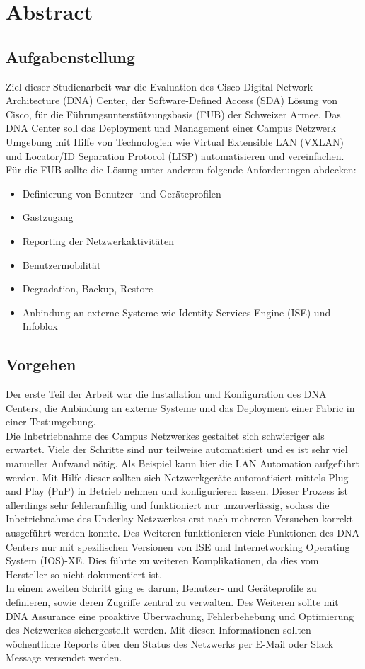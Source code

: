 \section{Abstract}

\subsection{Aufgabenstellung}

Ziel dieser Studienarbeit war die Evaluation des Cisco Digital Network Architecture (DNA) Center, der Software-Defined Access (SDA) Lösung von Cisco, für die Führungsunterstützungsbasis (FUB) der Schweizer Armee. Das DNA Center soll das Deployment und Management einer Campus Netzwerk Umgebung mit Hilfe von Technologien wie Virtual Extensible LAN (VXLAN) und Locator/ID Separation Protocol (LISP) automatisieren und vereinfachen.\\
Für die FUB sollte die Lösung unter anderem folgende Anforderungen abdecken:
\begin{itemize}
	\item Definierung von Benutzer- und Geräteprofilen
	\item Gastzugang
	\item Reporting der Netzwerkaktivitäten
	\item Benutzermobilität
	\item Degradation, Backup, Restore
	\item Anbindung an externe Systeme wie Identity Services Engine (ISE) und Infoblox
\end{itemize}

\subsection{Vorgehen}
Der erste Teil der Arbeit war die Installation und Konfiguration des DNA Centers, die Anbindung an externe Systeme und das Deployment einer Fabric in einer Testumgebung.\\
Die Inbetriebnahme des Campus Netzwerkes gestaltet sich schwieriger als erwartet. Viele der Schritte sind nur teilweise automatisiert und es ist sehr viel manueller Aufwand nötig. Als Beispiel kann hier die LAN Automation aufgeführt werden. Mit Hilfe dieser sollten sich Netzwerkgeräte automatisiert mittels Plug and Play (PnP) in Betrieb nehmen und konfigurieren lassen. Dieser Prozess ist allerdings sehr fehleranfällig und funktioniert nur unzuverlässig, sodass die Inbetriebnahme des Underlay Netzwerkes erst nach mehreren Versuchen korrekt ausgeführt werden konnte. 
Des Weiteren funktionieren viele Funktionen des DNA Centers nur mit spezifischen Versionen von ISE und  Internetworking Operating System (IOS)-XE. Dies führte zu weiteren Komplikationen, da dies vom Hersteller so nicht dokumentiert ist. \\
In einem zweiten Schritt ging es darum, Benutzer- und Geräteprofile zu definieren, sowie deren Zugriffe zentral zu verwalten. Des Weiteren sollte mit DNA Assurance eine proaktive Überwachung, Fehlerbehebung und Optimierung des Netzwerkes sichergestellt werden. Mit diesen Informationen sollten wöchentliche Reports über den Status des Netzwerks per E-Mail oder Slack Message versendet werden.
